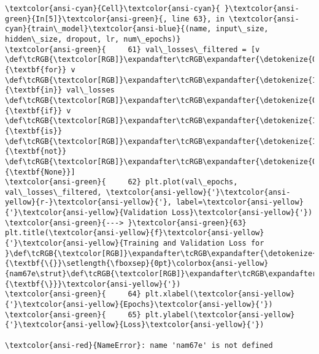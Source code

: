 \documentclass[11pt]{article}
\begin{document}
\begin{Verbatim}[commandchars=\\\{\}, frame=single, framerule=2mm, rulecolor=\color{outerrorbackground}]
\textcolor{ansi-cyan}{Cell}\textcolor{ansi-cyan}{ }\textcolor{ansi-green}{In[5]}\textcolor{ansi-green}{, line 63}, in \textcolor{ansi-cyan}{train\_model}\textcolor{ansi-blue}{(name, input\_size, hidden\_size, dropout, lr, num\_epochs)}
\textcolor{ansi-green}{     61} val\_losses\_filtered = [v \def\tcRGB{\textcolor[RGB]}\expandafter\tcRGB\expandafter{\detokenize{0,135,0}}{\textbf{for}} v \def\tcRGB{\textcolor[RGB]}\expandafter\tcRGB\expandafter{\detokenize{175,0,255}}{\textbf{in}} val\_losses \def\tcRGB{\textcolor[RGB]}\expandafter\tcRGB\expandafter{\detokenize{0,135,0}}{\textbf{if}} v \def\tcRGB{\textcolor[RGB]}\expandafter\tcRGB\expandafter{\detokenize{175,0,255}}{\textbf{is}} \def\tcRGB{\textcolor[RGB]}\expandafter\tcRGB\expandafter{\detokenize{175,0,255}}{\textbf{not}} \def\tcRGB{\textcolor[RGB]}\expandafter\tcRGB\expandafter{\detokenize{0,135,0}}{\textbf{None}}]
\textcolor{ansi-green}{     62} plt.plot(val\_epochs, val\_losses\_filtered, \textcolor{ansi-yellow}{'}\textcolor{ansi-yellow}{r-}\textcolor{ansi-yellow}{'}, label=\textcolor{ansi-yellow}{'}\textcolor{ansi-yellow}{Validation Loss}\textcolor{ansi-yellow}{'})
\textcolor{ansi-green}{---> }\textcolor{ansi-green}{63} plt.title(\textcolor{ansi-yellow}{f}\textcolor{ansi-yellow}{'}\textcolor{ansi-yellow}{Training and Validation Loss for }\def\tcRGB{\textcolor[RGB]}\expandafter\tcRGB\expandafter{\detokenize{175,95,135}}{\textbf{\{}}\setlength{\fboxsep}{0pt}\colorbox{ansi-yellow}{nam67e\strut}\def\tcRGB{\textcolor[RGB]}\expandafter\tcRGB\expandafter{\detokenize{175,95,135}}{\textbf{\}}}\textcolor{ansi-yellow}{'})
\textcolor{ansi-green}{     64} plt.xlabel(\textcolor{ansi-yellow}{'}\textcolor{ansi-yellow}{Epochs}\textcolor{ansi-yellow}{'})
\textcolor{ansi-green}{     65} plt.ylabel(\textcolor{ansi-yellow}{'}\textcolor{ansi-yellow}{Loss}\textcolor{ansi-yellow}{'})

\textcolor{ansi-red}{NameError}: name 'nam67e' is not defined
    \end{Verbatim}

    \begin{center}
    \end{center}
    { \hspace*{\fill} \\}
    
\end{document}
